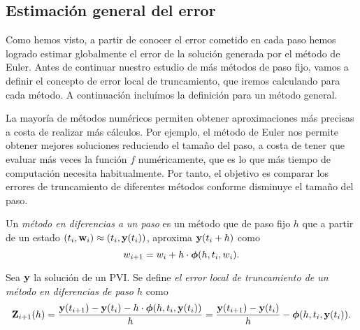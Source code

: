 \subsection{Estimación general del error}

Como hemos visto, a partir de conocer el error cometido en cada paso
hemos logrado estimar globalmente
el error de la solución generada por el método de Euler.
Antes de continuar nuestro estudio de más métodos de paso fijo,
vamos a definir el concepto de error local de truncamiento,
que iremos calculando para cada método.
A continuación incluímos la definición para un método general.



La mayoría de métodos numéricos permiten obtener aproximaciones más precisas
a costa de realizar más cálculos.
Por ejemplo, el método de Euler nos permite
obtener mejores soluciones reduciendo el tamaño del paso,
a costa de tener que evaluar más veces la función $f$ numéricamente,
que es lo que más tiempo de computación necesita habitualmente.
Por tanto, el objetivo es
comparar los errores de truncamiento de diferentes métodos
conforme disminuye el tamaño del paso.

\begin{definition}
    Un \emph{método en diferencias a un paso} es un método que de paso fijo $h$
    que a partir de un estado $(t_i, \vb{w}{}_i) \approx (t_i, \vb{y}{}(t_i))$,
    aproxima $\vb{y}{}(t_i + h)$ como
    \begin{equation*}
        w_{i+1} = w_i + h\cdot \vb*{\phi}(h, t_i, w_i).
    \end{equation*}
\end{definition}

\begin{definition}
    Sea $\vb{y}{}$ la solución de un PVI.
    Se define \emph{el error local de truncamiento
    de un método en diferencias de paso $h$} como
    \begin{equation*}
        \vb{Z}{}_{i+1}(h) =
        \frac{\vb{y}{}(t_{i+1}) - \vb{y}{}(t_i) - h\cdot \vb*{\phi}(h, t_i, \vb{y}{}(t_i))}{h} =
        \frac{\vb{y}{}(t_{i+1}) - \vb{y}{}(t_i)}{h} - \vb*{\phi}(h, t_i, \vb{y}{}(t_i)).
    \end{equation*}
\end{definition}


